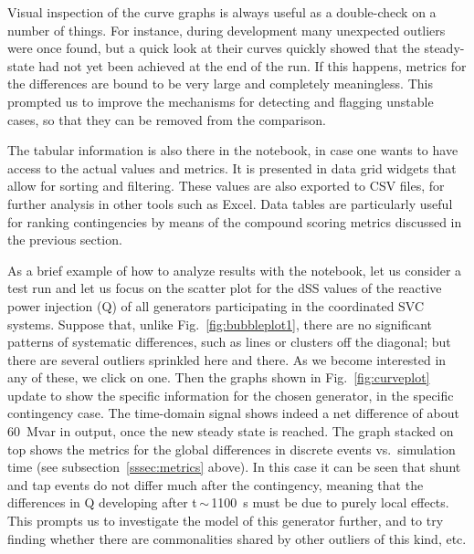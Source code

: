 \documentclass[conference]{IEEEtran}
\begin{document}
Visual inspection of the curve graphs is always useful as a double-check on a
number of things. For instance, during development many unexpected outliers were
once found, but a quick look at their curves quickly showed that the
steady-state had not yet been achieved at the end of the run. If this happens,
metrics for the differences are bound to be very large and completely
meaningless.  This prompted us to improve the mechanisms for detecting and
flagging unstable cases, so that they can be removed from the comparison.

The tabular information is also there in the notebook, in case one wants to have
access to the actual values and metrics. It is presented in data grid widgets
that allow for sorting and filtering.  These values are also exported to CSV
files, for further analysis in other tools such as Excel.  Data tables are
particularly useful for ranking contingencies by means of the compound scoring
metrics discussed in the previous section.

As a brief example of how to analyze results with the notebook, let us consider
a test run and let us focus on the scatter plot for the dSS values of the
reactive power injection (Q) of all generators participating in the coordinated
SVC systems. Suppose that, unlike Fig.~\ref{fig:bubbleplot1}, there are no
significant patterns of systematic differences, such as lines or clusters off
the diagonal; but there are several outliers sprinkled here and there.  As we
become interested in any of these, we click on one. Then the graphs shown in
Fig.~\ref{fig:curveplot} update to show the specific information for the chosen
generator, in the specific contingency case. The time-domain signal shows indeed
a net difference of about \SI{60}{Mvar} in output, once the new steady state is
reached. The graph stacked on top shows the metrics for the global differences
in discrete events vs.~simulation time (see subsection~\ref{sssec:metrics}
above).  In this case it can be seen that shunt and tap events do not differ
much after the contingency, meaning that the differences in Q developing after
t\,$\sim$\,\SI{1100}{s} must be due to purely local effects. This prompts us to
investigate the model of this generator further, and to try finding whether
there are commonalities shared by other outliers of this kind, etc.
\end{document}
